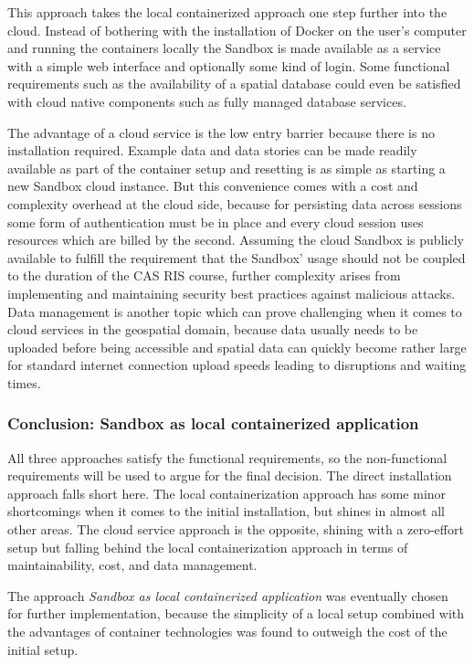 \documentclass[11pt, a4paper, oneside, parskip=full-]{scrartcl}
\begin{document}
This approach takes the local containerized approach one step further into the
cloud. Instead of bothering with the installation of Docker on the user's
computer and running the containers locally the Sandbox is made available as a
service with a simple web interface and optionally some kind of login. Some
functional requirements such as the availability of a spatial database could
even be satisfied with cloud native components such as fully managed database
services.

The advantage of a cloud service is the low entry barrier because there is no
installation required. Example data and data stories can be made readily
available as part of the container setup and resetting is as simple as starting
a new Sandbox cloud instance. But this convenience comes with a cost and
complexity overhead at the cloud side, because for persisting data across
sessions some form of authentication must be in place and every cloud session
uses resources which are billed by the second. Assuming the cloud Sandbox is
publicly available to fulfill the requirement that the Sandbox' usage should not
be coupled to the duration of the CAS RIS course, further complexity arises from
implementing and maintaining security best practices against malicious attacks.
Data management is another topic which can prove challenging when it comes to
cloud services in the geospatial domain, because data usually needs to be
uploaded before being accessible and spatial data can quickly become rather
large for standard internet connection upload speeds leading to disruptions and
waiting times.

\subsubsection*{Conclusion: Sandbox as local containerized application}
All three approaches satisfy the functional requirements, so the non-functional
requirements will be used to argue for the final decision. The direct
installation approach falls short here. The local containerization approach has
some minor shortcomings when it comes to the initial installation, but shines in
almost all other areas. The cloud service approach is the opposite, shining with
a zero-effort setup but falling behind the local containerization approach in
terms of maintainability, cost, and data management.

The approach \emph{Sandbox as local containerized application} was eventually
chosen for further implementation, because the simplicity of a local setup
combined with the advantages of container technologies was found to outweigh the
cost of the initial setup.
\end{document}
